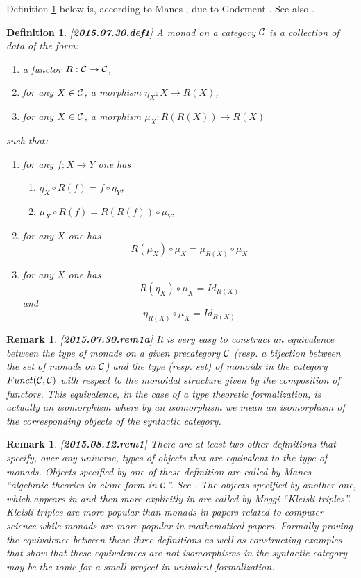 \documentclass[11pt]{article}
\newtheorem{definition}[proposition]{Definition}
\newtheorem{remark}[proposition]{Remark}
\newcommand{\llabel}[1]{\label{#1}[{\bf #1}]}
\newcommand{\sr}{\rightarrow}
\begin{document}
{%
Definition \ref{2015.07.30.def1} below is, according to Manes \cite[p.30]{Manes}, due to Godement \cite{Godement}. See also \cite[Ch. VI]{MacLane}.
%
\begin{definition}
\llabel{2015.07.30.def1}
A monad on a category $\cal C$ is a collection of data of the form:
%
\begin{enumerate}
\item a functor $R:{\cal C}\sr {\cal C}$,
\item for any $X\in {\cal C}$, a morphism $\eta_X:X\sr R(X)$,
\item for any $X\in {\cal C}$, a morphism $\mu_X:R(R(X))\sr R(X)$
\end{enumerate}
%
such that:
%
\begin{enumerate}
\item for any $f:X\sr Y$ one has 
%
\begin{enumerate}
\item $\eta_X\circ R(f)=f\circ \eta_Y$,
\item $\mu_X\circ R(f)=R(R(f))\circ \mu_Y$,
\end{enumerate}
%
\item for any $X$ one has 
%
$$R(\mu_X)\circ \mu_X=\mu_{R(X)}\circ \mu_X$$
%
\item for any $X$ one has
%
$$R(\eta_X)\circ \mu_X=Id_{R(X)}$$
%
and
%
$$\eta_{R(X)}\circ \mu_X=Id_{R(X)}$$
%
\end{enumerate}
\end{definition}
%
\begin{remark}\rm
\llabel{2015.07.30.rem1a}
It is very easy to construct an equivalence between the type of monads on a given precategory $\cal C$ (resp. a bijection between the set of monads on $\cal C$) and the type (resp. set) of monoids in the category $Funct({\cal C},{\cal C})$ with respect to the monoidal structure given by the composition of functors. This equivalence, in the case of a type theoretic formalization, is actually an isomorphism where by an isomorphism we mean an isomorphism of the corresponding objects of the syntactic category. 
\end{remark}
%
\begin{remark}\rm
\llabel{2015.08.12.rem1}
There are at least two other definitions that specify, over any universe, types of objects that are equivalent to the type of monads. Objects specified by one of these definition are called by Manes ``algebraic theories in clone form in $\cal C$''. See \cite[Def. 3.2, p.24]{Manes}. The objects specified by another one, which appears in \cite[Exercise 12, p.32]{Manes} and then more explicitly in \cite{Moggi91} are called by Moggi  ``Kleisli triples''. Kleisli triples are more popular than monads in papers related to computer science while monads are more popular in mathematical papers. Formally proving the equivalence between these three definitions as well as constructing examples that show that these equivalences are not isomorphisms in the syntactic category may be the topic for a small project in univalent formalization.


\end{remark}}
\end{document}

